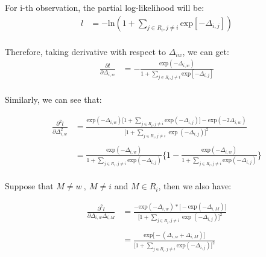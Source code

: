\documentclass[]{article}
\begin{document}
For i-th observation, the partial log-likelihood will be:
\begin{equation}\begin{aligned}\label{eqn:ithPart}
l &= -\text{ln}(1+{\sum_{j\in R_i, j \ne i}^{}\text{exp}[-\Delta_{i,j}]}) \\
\end{aligned}\end{equation}

Therefore, taking derivative with respect to \(\Delta_{iw}\), we can
get: \begin{equation}\begin{aligned}\label{eqn:derivofPart}
\frac{\partial l}{\partial \Delta_{i,w}} &= -\frac{\text{exp}(-\Delta_{i,w})}{1+{\sum_{j\in R_i, j \ne i}^{}\text{exp}[-\Delta_{i,j}]}} \\
\end{aligned}\end{equation}

Similarly, we can see that:

\begin{equation}\begin{aligned}\label{eqn:secderivofPart}
\frac{\partial^2 l}{\partial \Delta_{i,w}^2} &= \frac{\text{exp}(-\Delta_{i,w})\big[1+ \sum_{j\in R_i,j\ne i}\text{exp}(-\Delta_{i,j})\big]-\text{exp}(-2\Delta_{i,w})}{\big[1+\sum_{j\in R_i,j \ne i}\exp(-\Delta_{i,j})\big]^2} \\
\\
                                            &= \frac{\text{exp}(-\Delta_{i,w})}{1+ \sum_{j\in R_i,j\ne i}\text{exp}(-\Delta_{i,j})} \bigg\{1-\frac{\text{exp}(-\Delta_{i,w})}{1+ \sum_{j\in R_i,j\ne i}\text{exp}(-\Delta_{i,j})}\bigg \} \\
\end{aligned}\end{equation}

Suppose that \(M\ne w \ , \ M\neq i\) and \(M\in R_i\), then we also
have:

\begin{equation}\begin{aligned}\label{eqn:secderivofPart3}
\frac{\partial^2 l}{\partial \Delta_{i,w} \Delta_{i,M}} &= \frac{-\text{exp}(-\Delta_{i,w})*\big[-\text{exp}(-\Delta_{i,M})\big]}{\big[1+\sum_{j\in R_i,j \ne i}\exp(-\Delta_{i,j})\big]^2}\\
   \\
                                                      &= \frac{\text{exp}\big[-(\Delta_{i,w}+\Delta_{i,M})\big]}{\big[1+\sum_{j\in R_i,j \ne i}\text{exp}(-\Delta_{i,j})\big]^2}
\end{aligned}\end{equation}
\end{document}
